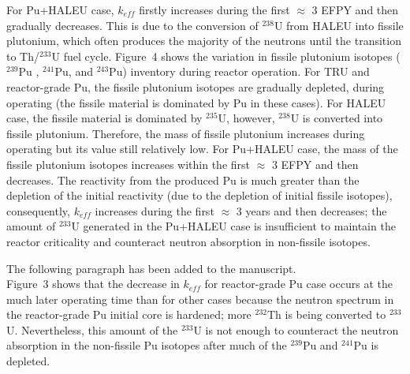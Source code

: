 \documentclass[answers,11pt]{exam}
\begin{document}
\begin{questions}
\begin{solution}
                 For Pu+HALEU case, $k_{eff}$ firstly increases during the first $\approx$ $3$ EFPY and then gradually decreases. This is due to the conversion of $^{238}$U from HALEU into fissile plutonium, which often produces the majority of the neutrons until the transition to Th/$^{233}$U fuel cycle. Figure~4 shows the variation in fissile plutonium isotopes ($^{239}$Pu , $^{241}$Pu, and $^{243}$Pu) inventory during reactor operation. For TRU and reactor-grade Pu, the fissile plutonium isotopes are gradually depleted, during operating (the fissile material is dominated by Pu in these cases). For HALEU case, the fissile material is dominated by $^{235}$U, however, $^{238}$U is converted into fissile plutonium. Therefore, the mass of fissile plutonium increases during operating but its value still relatively low. For Pu+HALEU case, the mass of the fissile plutonium isotopes increases within the first $\approx$ $3$ EFPY and then decreases. The reactivity from the produced Pu is much greater than the depletion of the initial reactivity (due to the depletion of initial fissile isotopes), consequently, $k_{eff}$ increases during the first $\approx$ $3$ years and then decreases; the amount of $^{233}$U generated in the Pu+HALEU case is insufficient to maintain the reactor criticality and counteract neutron absorption in non-fissile isotopes.
                 
                 
                 The following paragraph has been added to the manuscript.\\
                 
                 Figure~3 shows that the decrease in $k_{eff}$ for reactor-grade Pu case occurs at the much later operating time than for other cases because the neutron spectrum in the reactor-grade Pu initial core is hardened; more $^{232}$Th is being converted to $^{233}$U. Nevertheless, this amount of the $^{233}$U is not enough to counteract the neutron absorption in the non-fissile Pu isotopes after much of the $^{239}$Pu and $^{241}$Pu is depleted.
                 
        \end{solution}


\end{questions}
\end{document}
